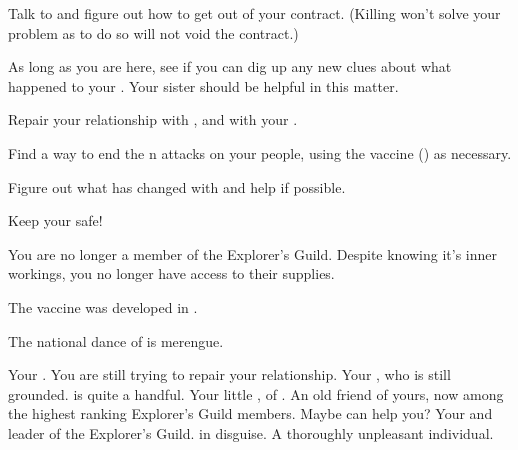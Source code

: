 \documentclass[char]{NeptuneBall}
\begin{document}
\begin{itemz}[Goals]
  \item Talk to \cWitch{} and figure out how to get out of your contract. (Killing \cWitch{} won't solve your problem as to do so will not void the contract.)
  \item As long as you are here, see if you can dig up any new  clues about what happened to your \cAthena{\parent}. Your sister should be helpful in this matter.
  \item Repair your relationship with \cKing{\King} \cKing{}, and with your \cPrincess{\sibling} \cPrincess{}.
	\item Find a way to end the \pPacifica{}n attacks on your people, using the vaccine (\iVaccine{}) as necessary.
  \item Figure out what has changed with \cPriest{} and help \cPriest{\them} if possible.
  \item Keep your \cWillow{\offspring} safe!
\end{itemz}

\begin{itemz}[Notes]
  \item You are no longer a member of the Explorer's Guild. Despite knowing it's inner workings, you no longer have access to their supplies.
\end{itemz}

\begin{itemz}[Trivia]
  \item The \ppolio{} vaccine was developed in \pCity{}.
  \item The national dance of \pAtlantis{} is merengue.
\end{itemz}

\begin{contacts}
  \contact{\cKing{}} Your \cKing{\parent}. You are still trying to repair your relationship.
  \contact{\cWillow{}} Your \cWillow{\offspring}, who is still grounded. \cWillow{\They} is quite a handful.
  \contact{\cPrincess{}} Your little \cPrincess{\sibling}, \cPrincess{\prince} of \pAtlantis{}.
  \contact{\cPriest{}} An old friend of yours, now among the highest ranking Explorer's Guild members. Maybe \cPriest{\they} can help you?
  \contact{\cPlant{}} Your \cPlant{\uncle} and leader of the Explorer's Guild.
	\contact{\cWitch{\MYname}} \cWitch{} in disguise. A thoroughly unpleasant individual.
\end{contacts}
\end{document}
